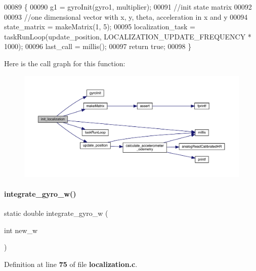 \begin{DoxyCode}
00089                                                                                                            
                    \{
00090   g1 = gyroInit(gyro1, multiplier);
00091   \textcolor{comment}{//init state matrix}
00092 
00093   \textcolor{comment}{//one dimensional vector with x, y, theta, acceleration in x and y}
00094   state_matrix = makeMatrix(1, 5);
00095   localization_task = taskRunLoop(update_position, LOCALIZATION_UPDATE_FREQUENCY * 1000);
00096   last_call = millis();
00097   \textcolor{keywordflow}{return} \textcolor{keyword}{true};
00098 \}
\end{DoxyCode}
Here is the call graph for this function\+:\nopagebreak
\begin{figure}[H]
\begin{center}
\leavevmode
\includegraphics[width=350pt]{localization_8c_afdd0147de6aa15957e9a125f9cd20578_cgraph}
\end{center}
\end{figure}
\mbox{\label{localization_8c_ac103fff038e59ff45f292b9b5138182e}} 
\paragraph{integrate\+\_\+gyro\+\_\+w()}
{\footnotesize\ttfamily static double integrate\+\_\+gyro\+\_\+w (\begin{DoxyParamCaption}\item[{int}]{new\+\_\+w }\end{DoxyParamCaption})\hspace{0.3cm}{\ttfamily [static]}}



Definition at line \textbf{ 75} of file \textbf{ localization.\+c}.



